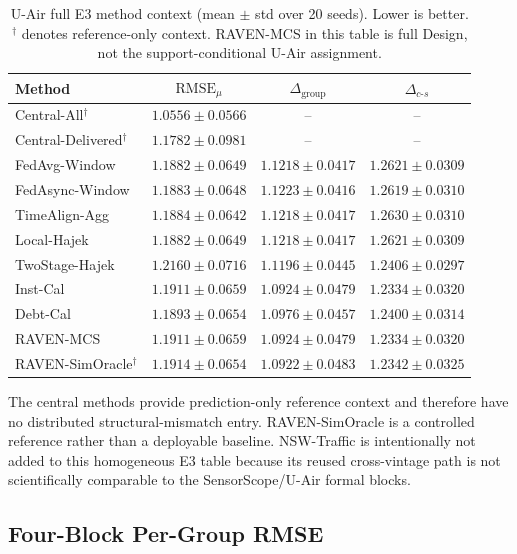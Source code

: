 \begin{table}[!htbp]
\centering
\caption{U-Air full E3 method context (mean $\pm$ std over 20 seeds).
Lower is better.  $^\dagger$ denotes reference-only context.
RAVEN-MCS in this table is full Design, not the support-conditional U-Air assignment.}
\label{tab:app_e3_uair}
\scriptsize
\setlength{\tabcolsep}{3pt}
\begin{tabular*}{\columnwidth}{@{\extracolsep{\fill}}lccc}
\toprule
Method & $\mathrm{RMSE}_{\mu}$ & $\Delta_{\mathrm{group}}$ & $\Delta_{c\text{-}s}$\\
\midrule
Central-All$^{\dagger}$ & $1.0556\pm0.0566$ & -- & -- \\
Central-Delivered$^{\dagger}$ & $1.1782\pm0.0981$ & -- & -- \\
FedAvg-Window & $1.1882\pm0.0649$ & $1.1218\pm0.0417$ & $1.2621\pm0.0309$ \\
FedAsync-Window & $1.1883\pm0.0648$ & $1.1223\pm0.0416$ & $1.2619\pm0.0310$ \\
TimeAlign-Agg & $1.1884\pm0.0642$ & $1.1218\pm0.0417$ & $1.2630\pm0.0310$ \\
Local-Hajek & $1.1882\pm0.0649$ & $1.1218\pm0.0417$ & $1.2621\pm0.0309$ \\
TwoStage-Hajek & $1.2160\pm0.0716$ & $1.1196\pm0.0445$ & $1.2406\pm0.0297$ \\
Inst-Cal & $1.1911\pm0.0659$ & $1.0924\pm0.0479$ & $1.2334\pm0.0320$ \\
Debt-Cal & $1.1893\pm0.0654$ & $1.0976\pm0.0457$ & $1.2400\pm0.0314$ \\
RAVEN-MCS & $1.1911\pm0.0659$ & $1.0924\pm0.0479$ & $1.2334\pm0.0320$ \\
RAVEN-SimOracle$^{\dagger}$ & $1.1914\pm0.0654$ & $1.0922\pm0.0483$ & $1.2342\pm0.0325$ \\
\bottomrule
\end{tabular*}
\end{table}

The central methods provide prediction-only reference context and therefore
have no distributed structural-mismatch entry.  RAVEN-SimOracle is a controlled
reference rather than a deployable baseline.  NSW-Traffic is intentionally not
added to this homogeneous E3 table because its reused cross-vintage path is not
scientifically comparable to the SensorScope/U-Air formal blocks.

\subsection{Four-Block Per-Group RMSE}
\label{app:block_rmse}

